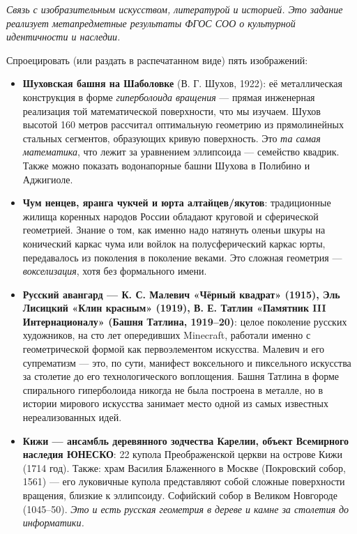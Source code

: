 \documentclass[12pt,a4paper]{scrartcl}
\newcommand{\acc}[1]{\textcolor{accent}{\textbf{#1}}}
\newcommand{\tempo}[1]{\textnormal{\footnotesize\color{bg!90!white}\textsf{#1}}}
\begin{document}
\begin{zadanie}[3.4 --- Диалог с визуальным наследием России \quad\tempo{10 мин}]\label{at:34}
\emph{Связь с изобразительным искусством, литературой и историей. Это задание реализует метапредметные результаты ФГОС СОО о культурной идентичности и наследии.}

Спроецировать (или раздать в распечатанном виде) пять изображений:

\begin{itemize}[leftmargin=1.3em,itemsep=0.2em,topsep=0.3em,nosep]
  \item \acc{Шуховская башня на Шаболовке} (В. Г. Шухов, 1922): её металлическая конструкция в форме \emph{гиперболоида вращения} --- прямая инженерная реализация той математической поверхности, что мы изучаем. Шухов высотой 160 метров рассчитал оптимальную геометрию из прямолинейных стальных сегментов, образующих кривую поверхность. Это \emph{та самая математика}, что лежит за уравнением эллипсоида --- семейство квадрик. Также можно показать водонапорные башни Шухова в Полибино и Аджигиоле.

  \item \acc{Чум ненцев, яранга чукчей и юрта алтайцев/якутов}: традиционные жилища коренных народов России обладают круговой и сферической геометрией. Знание о том, как именно надо натянуть оленьи шкуры на конический каркас чума или войлок на полусферический каркас юрты, передавалось из поколения в поколение веками. Это сложная геометрия --- \emph{воксе\-ли\-зация}, хотя без формального имени.

  \item \acc{Русский авангард --- К. С. Малевич «Чёрный квадрат» (1915), Эль Лисицкий «Клин красным» (1919), В. Е. Татлин «Памятник III Интернационалу» (Башня Татлина, 1919--20)}: целое поколение русских художников, на сто лет опередивших Minecraft, работали именно с геометрической формой как первоэлементом искусства. Малевич и его супрематизм --- это, по сути, манифест воксельного и пиксельного искусства за столетие до его технологического воплощения. Башня Татлина в форме спирального гиперболоида никогда не была построена в металле, но в истории мирового искусства занимает место одной из самых известных нереализованных идей.

  \item \acc{Кижи --- ансамбль деревянного зодчества Карелии, объект Всемирного наследия ЮНЕСКО}: 22 купола Преображенской церкви на острове Кижи (1714 год). Также: храм Василия Блаженного в Москве (Покровский собор, 1561) --- его луковичные купола представляют собой сложные поверхности вращения, близкие к эллипсоиду. Софийский собор в Великом Новгороде (1045--50). \emph{Это и есть русская геометрия в дереве и камне за столетия до информатики.}


\end{itemize}
\end{zadanie}
\end{document}
